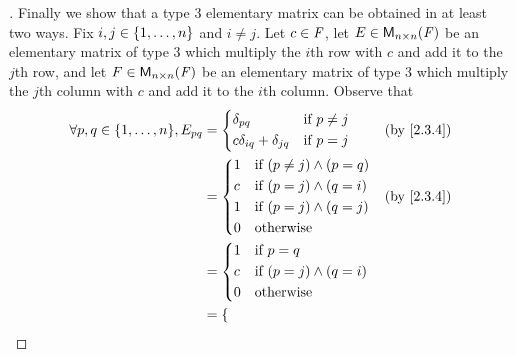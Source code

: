 \begin{proof}[]
  Finally we show that a type 3 elementary matrix can be obtained in at least two ways.
  Fix \(i, j \in \left\lbrace1, \dots, n\right\rbrace\) and \(i \neq j\).
  Let \(c \in \mathit{F}\), let \(E \in \mathsf{M}_{{n} \times n}({\mathit{F}})\) be an elementary matrix of type 3 which multiply the \(i\)th row with \(c\) and add it to the \(j\)th row, and let \(F \in \mathsf{M}_{{n} \times n}({\mathit{F}})\) be an elementary matrix of type 3 which multiply the \(j\)th column with \(c\) and add it to the \(i\)th column.
  Observe that
  \begin{align*}
    \forall p, q \in \set{1, \dots, n}, E_{p q} & = \begin{dcases}
                                                      \delta_{p q}                  & \text{if } p \neq j \\
                                                      c \delta_{i q} + \delta_{j q} & \text{if } p = j
                                                    \end{dcases} &  & \text{(by \cref{2.3.4})}                                \\
                                                & = \begin{dcases}
                                                      1 & \text{if } (p \neq j) \land (p = q) \\
                                                      c & \text{if } (p = j) \land (q = i)    \\
                                                      1 & \text{if } (p = j) \land (q = j)    \\
                                                      0 & \text{otherwise}
                                                    \end{dcases}             &  & \text{(by \cref{2.3.4})}                             \\
                                                & = \begin{dcases}
                                                      1 & \text{if } p = q                 \\
                                                      c & \text{if } (p = j) \land (q = i) \\
                                                      0 & \text{otherwise}
                                                    \end{dcases}                                               \\
                                                & = \begin{dcases}

\end{dcases}
\end{align*}
\end{proof}
